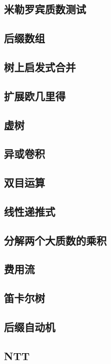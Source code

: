 	\subsection{米勒罗宾质数测试}
		
	\subsection{后缀数组}
		
	\subsection{树上启发式合并}
		
	\subsection{扩展欧几里得}
		
	\subsection{虚树}
		
	\subsection{异或卷积}
		
	\subsection{双目运算}
		
	\subsection{线性递推式}
		
	\subsection{分解两个大质数的乘积}
		
	\subsection{费用流}
		
	\subsection{笛卡尔树}
		
	\subsection{后缀自动机}
		
	\subsection{NTT}
		